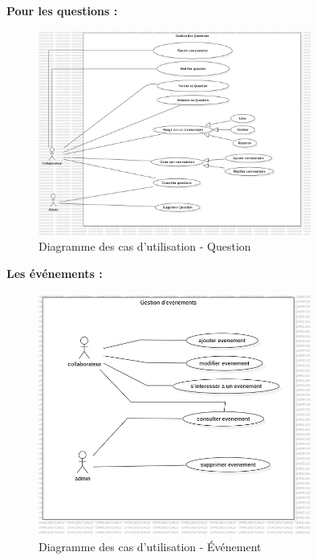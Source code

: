 \documentclass{article}
\begin{document}
                \textbf{Pour les questions :}
                \begin{figure}[h!]
                    \centering
                    \includegraphics[width=0.8\textwidth]{assets/diagrammes/jpg/Model1!useCaseQuestion_0.jpg}
                    \caption{Diagramme des cas d'utilisation - Question}
                \end{figure}
                
                \FloatBarrier
                
                \textbf{Les événements :}
                \begin{figure}[h!]
                    \centering
                    \includegraphics[width=0.8\textwidth]{assets/diagrammes/jpg/Model2!UseCaseEvent_1.jpg}
                    \caption{Diagramme des cas d'utilisation - Événement}
                \end{figure}
                
\end{document}
